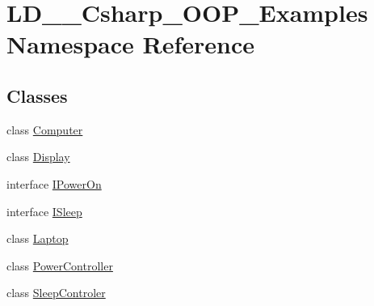 \hypertarget{namespace_l_d__03___csharp___o_o_p___examples}{}\section{L\+D\+\_\+\_\+\+Csharp\+\_\+\+O\+O\+P\+\_\+\+Examples Namespace Reference}
\label{namespace_l_d__03___csharp___o_o_p___examples}
\subsection*{Classes}
\begin{DoxyCompactItemize}
\item 
class \mbox{\hyperlink{class_l_d__03___csharp___o_o_p___examples_1_1_computer}{Computer}}
\item 
class \mbox{\hyperlink{class_l_d__03___csharp___o_o_p___examples_1_1_display}{Display}}
\item 
interface \mbox{\hyperlink{interface_l_d__03___csharp___o_o_p___examples_1_1_i_power_on}{I\+Power\+On}}
\item 
interface \mbox{\hyperlink{interface_l_d__03___csharp___o_o_p___examples_1_1_i_sleep}{I\+Sleep}}
\item 
class \mbox{\hyperlink{class_l_d__03___csharp___o_o_p___examples_1_1_laptop}{Laptop}}
\item 
class \mbox{\hyperlink{class_l_d__03___csharp___o_o_p___examples_1_1_power_controller}{Power\+Controller}}
\item 
class \mbox{\hyperlink{class_l_d__03___csharp___o_o_p___examples_1_1_sleep_controler}{Sleep\+Controler}}
\end{DoxyCompactItemize}
